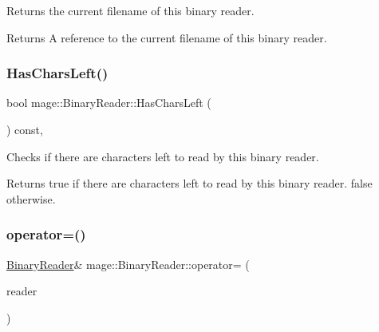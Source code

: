 Returns the current filename of this binary reader.

\begin{DoxyReturn}{Returns}
A reference to the current filename of this binary reader. 
\end{DoxyReturn}
\hypertarget{classmage_1_1_binary_reader_aec91fece03b619c158b133beb1bc9381}{}\label{classmage_1_1_binary_reader_aec91fece03b619c158b133beb1bc9381} 
\subsubsection{\texorpdfstring{Has\+Chars\+Left()}{HasCharsLeft()}}
{\footnotesize\ttfamily bool mage\+::\+Binary\+Reader\+::\+Has\+Chars\+Left (\begin{DoxyParamCaption}{ }\end{DoxyParamCaption}) const\hspace{0.3cm}{\ttfamily [protected]}, {\ttfamily [noexcept]}}

Checks if there are characters left to read by this binary reader.

\begin{DoxyReturn}{Returns}
{\ttfamily true} if there are characters left to read by this binary reader. {\ttfamily false} otherwise. 
\end{DoxyReturn}
\hypertarget{classmage_1_1_binary_reader_a0408bb456983b4a03ae42ab69c6f4bc3}{}\label{classmage_1_1_binary_reader_a0408bb456983b4a03ae42ab69c6f4bc3} 
\subsubsection{\texorpdfstring{operator=()}{operator=()}\hspace{0.1cm}{\footnotesize\ttfamily [1/2]}}
{\footnotesize\ttfamily \hyperlink{classmage_1_1_binary_reader}{Binary\+Reader}\& mage\+::\+Binary\+Reader\+::operator= (\begin{DoxyParamCaption}\item[{const \hyperlink{classmage_1_1_binary_reader}{Binary\+Reader} \&}]{reader }\end{DoxyParamCaption})\hspace{0.3cm}{\ttfamily [delete]}}


